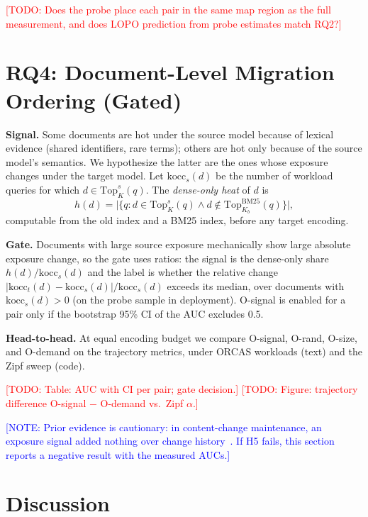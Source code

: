 \documentclass[conference]{IEEEtran}
\newcommand{\todo}[1]{\textcolor{red}{[TODO: #1]}}
\newcommand{\note}[1]{\textcolor{blue}{[NOTE: #1]}}
\newcommand{\topk}{\mathrm{Top}}
\begin{document}
\todo{Does the probe place each pair in the same map region as the full measurement,
and does LOPO prediction from probe estimates match RQ2?}

\section{RQ4: Document-Level Migration Ordering (Gated)}\label{sec:rq4}

\textbf{Signal.} Some documents are hot under the source model because of lexical
evidence (shared identifiers, rare terms); others are hot only because of the source
model's semantics. We hypothesize the latter are the ones whose exposure changes under
the target model. Let $\mathrm{kocc}_s(d)$ be the number of workload queries for which
$d\in\topk_K^{s}(q)$. The \emph{dense-only heat} of $d$ is
\[
h(d) = \bigl\lvert\{q : d\in\topk_K^{s}(q) \wedge d\notin\topk_{K_b}^{\mathrm{BM25}}(q)\}\bigr\rvert ,
\]
computable from the old index and a BM25 index, before any target encoding.

\textbf{Gate.} Documents with large source exposure mechanically show large absolute
exposure change, so the gate uses ratios: the signal is the dense-only share
$h(d)/\mathrm{kocc}_s(d)$ and the label is whether the relative change
$\lvert\mathrm{kocc}_t(d)-\mathrm{kocc}_s(d)\rvert/\mathrm{kocc}_s(d)$ exceeds its median, over
documents with $\mathrm{kocc}_s(d)>0$ (on the probe sample in deployment).
O-signal is enabled for a pair only if the bootstrap 95\% CI of the AUC excludes 0.5.

\textbf{Head-to-head.} At equal encoding budget we compare O-signal, O-rand, O-size,
and O-demand on the trajectory metrics, under ORCAS workloads (text) and the Zipf
sweep (code).

\todo{Table: AUC with CI per pair; gate decision.}
\todo{Figure: trajectory difference O-signal $-$ O-demand vs.\ Zipf $\alpha$.}

\note{Prior evidence is cautionary: in content-change maintenance, an exposure signal
added nothing over change history~\cite{cipbench}. If H5 fails, this section reports a
negative result with the measured AUCs.}

\section{Discussion}\label{sec:discussion}
\end{document}
